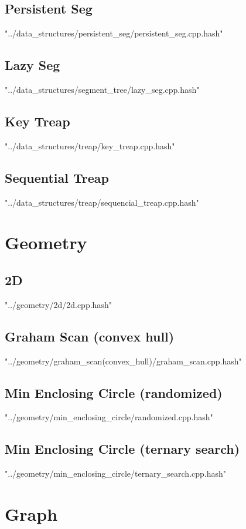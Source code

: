 \documentclass [12pt,onecolumn,oneside]{article}
\begin{document}
\subsection{ Persistent Seg}
 {"../data_structures/persistent_seg/persistent_seg.cpp.hash"}
\subsection{ Lazy Seg}
 {"../data_structures/segment_tree/lazy_seg.cpp.hash"}
\subsection{ Key Treap}
 {"../data_structures/treap/key_treap.cpp.hash"}
\subsection{ Sequential Treap}
 {"../data_structures/treap/sequencial_treap.cpp.hash"}
\newpage

\section{Geometry}
\subsection{ 2D}
 {"../geometry/2d/2d.cpp.hash"}
\subsection{ Graham Scan (convex hull)}
 {"../geometry/graham_scan(convex_hull)/graham_scan.cpp.hash"}
\subsection{ Min Enclosing Circle (randomized)}
 {"../geometry/min_enclosing_circle/randomized.cpp.hash"}
\subsection{ Min Enclosing Circle (ternary search)}
 {"../geometry/min_enclosing_circle/ternary_search.cpp.hash"}
\newpage

\section{Graph}
\end{document}
